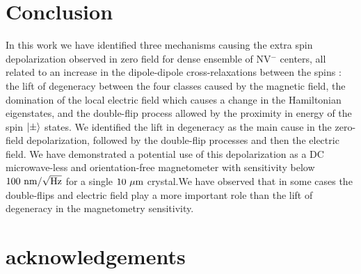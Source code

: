 \documentclass[preprintnumbers,amsmath,amssymb,superscriptaddress,twocolumn,showpacs]{revtex4-2}
\begin{document}
\section*{Conclusion}
In this work we have identified three mechanisms causing the extra spin depolarization observed in zero field for dense ensemble of NV$^-$ centers, all related to an increase in the dipole-dipole cross-relaxations between the spins : the lift of degeneracy between the four classes caused by the magnetic field, the domination of the local electric field which causes a change in the Hamiltonian eigenstates, and the double-flip process allowed by the proximity in energy of the spin $\ket{\pm}$ states. We identified the lift in degeneracy as the main cause in the zero-field depolarization, followed by the double-flip processes and then the electric field. We have demonstrated a potential use of this depolarization as a DC microwave-less and orientation-free magnetometer with sensitivity below $100\ \rm{nm}/\sqrt{\rm Hz}$ for a single $10\ \mu \rm m$ crystal.We have observed that in some cases the double-flips and electric field play a more important role than the lift of degeneracy in the magnetometry sensitivity.
\section*{acknowledgements}


{}
\end{document}
